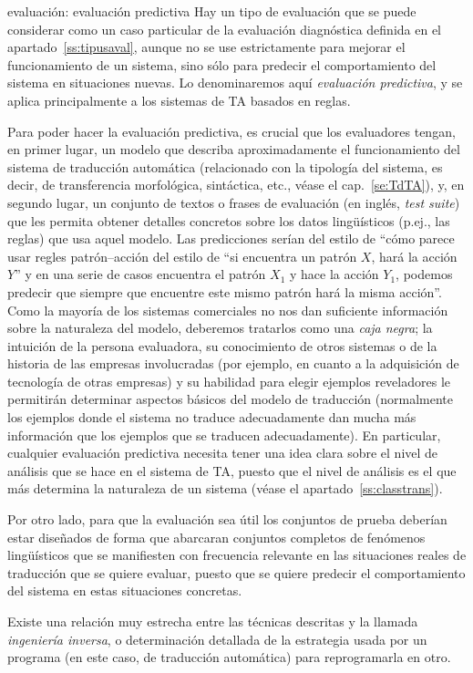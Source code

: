 \begin{persabermes}{evaluación: evaluación predictiva} Hay un tipo de evaluación que se puede considerar como un caso particular de la evaluación diagnóstica definida en el apartado~\ref{ss:tipusaval}, aunque no se use estrictamente para mejorar el funcionamiento de un sistema, sino sólo para predecir el comportamiento del sistema en situaciones nuevas. Lo denominaremos aquí \emph{evaluación predictiva}, y se aplica principalmente a los sistemas de TA basados en reglas. 

Para poder hacer la evaluación predictiva, es crucial que los evaluadores tengan, en primer lugar, un modelo que describa aproximadamente el funcionamiento del sistema de traducción automática (relacionado con la tipología del sistema, es decir, de transferencia morfológica, sintáctica, etc., véase el cap.~\ref{se:TdTA}), y, en segundo lugar, un conjunto de textos o frases de evaluación (en inglés, \emph{test suite}) que les permita obtener detalles concretos sobre los datos lingüísticos (p.ej., las reglas) que usa aquel modelo. Las predicciones serían del estilo de ``cómo parece usar regles patrón--acción del estilo de ``si encuentra un patrón $X$, hará la acción $Y$'' y en una serie de casos encuentra el patrón $X_1$ y hace la acción $Y_1$, podemos predecir que siempre que encuentre este mismo patrón hará la misma acción''. Como la mayoría de los sistemas comerciales no nos dan suficiente información sobre la naturaleza del modelo, deberemos tratarlos como una \emph{caja negra}; la intuición de la persona evaluadora, su conocimiento de otros sistemas o de la historia de las empresas involucradas (por ejemplo, en cuanto a la adquisición de tecnología de otras empresas) y su habilidad para elegir ejemplos reveladores le permitirán determinar aspectos básicos del modelo de traducción (normalmente los ejemplos donde el sistema no traduce adecuadamente dan mucha más información que los ejemplos que se traducen adecuadamente). En particular, cualquier evaluación predictiva necesita tener una idea clara sobre el nivel de análisis que se hace en el sistema de TA, puesto que el nivel de análisis es el que más determina la naturaleza de un sistema (véase el apartado~\ref{ss:classtrans}). 

Por otro lado, para que la evaluación sea útil los conjuntos de prueba deberían estar diseñados de forma que abarcaran conjuntos completos de fenómenos lingüísticos que se manifiesten con frecuencia relevante en las situaciones reales de traducción que se quiere evaluar, puesto que se quiere predecir el comportamiento del sistema en estas situaciones concretas. 

Existe una relación muy estrecha entre las técnicas descritas y la llamada \emph{ingeniería inversa}, o determinación detallada de la estrategia usada por un programa (en este caso, de traducción automática) para reprogramarla en otro. \end{persabermes} 


